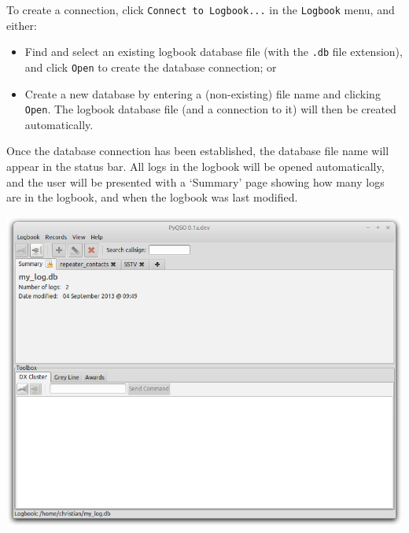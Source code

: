 \documentclass[11pt, a4paper]{report}
\begin{document}
To create a connection, click \texttt{Connect to Logbook...} in the \texttt{Logbook} menu, and either:
\begin{itemize}
  \item Find and select an existing logbook database file (with the \texttt{.db} file extension), and click \texttt{Open} to create the database connection; or
  \item Create a new database by entering a (non-existing) file name and clicking \texttt{Open}. The logbook database file (and a connection to it) will then be created automatically.
\end{itemize}
Once the database connection has been established, the database file name will appear in the status bar. All logs in the logbook will be opened automatically, and the user will be presented with a `Summary' page showing how many logs are in the logbook, and when the logbook was last modified.

\begin{center}
  \includegraphics[width=1\columnwidth]{images/summary.png}
\end{center}
\end{document}
